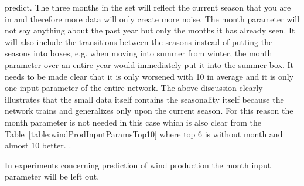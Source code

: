 predict. The three months in the set will reflect the current season that you are in and therefore more data will only create more noise. The month parameter will not say anything about the past year but only the months it has already seen. It will also include the transitions between the seasons instead of putting the seasons into boxes, e.g. when moving into summer from winter, the month parameter over an entire year would immediately put it into the summer box. It needs to be made clear that it is only worsened with 10 in average and it is only one input parameter of the entire network. The above discussion clearly illustrates that the small data itself contains the seasonality itself because the network trains and generalizes only upon the current season. For this reason the month parameter is not needed in this case which is also clear from the Table~\ref{table:windProdInputParamsTop10} where top 6 is without month and almost 10 better. . 

In experiments concerning prediction of wind production the month input parameter will be left out.  

